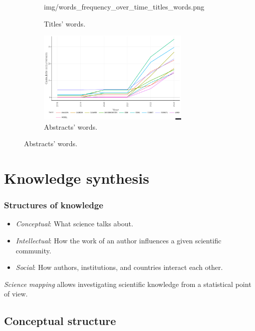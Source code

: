 \documentclass[aspectratio=169]{beamer}
\begin{document}
\begin{frame}
\begin{figure}
\begin{subfigure}{0.4\textwidth}
      {img/words_frequency_over_time_titles_words.png}
      \caption{Titles' words.}
      \label{fig:wordcloud_titles_words} 
    \end{subfigure}
    \begin{subfigure}{0.4\textwidth}
      \includegraphics[width=0.8\textwidth]
      {img/words_frequency_over_time_abstracts_words.png}
      \caption{Abstracts' words.}
      \label{fig:wordcloud_abstract_words} 
    \end{subfigure}
  \end{figure}
\end{frame}



\section{Knowledge synthesis}

\begin{frame}
  \frametitle{Structures of knowledge}
  \begin{itemize}
    \item \emph{Conceptual}: What science talks about. 
    \item \emph{Intellectual}: How the work of an author influences a given 
      scientific community. 
    \item \emph{Social}: How authors, institutions, and countries interact each
      other.
  \end{itemize}
  \emph{Science mapping} allows investigating scientific knowledge from a 
  statistical point of view.
\end{frame}


\subsection{Conceptual structure}
\end{document}

